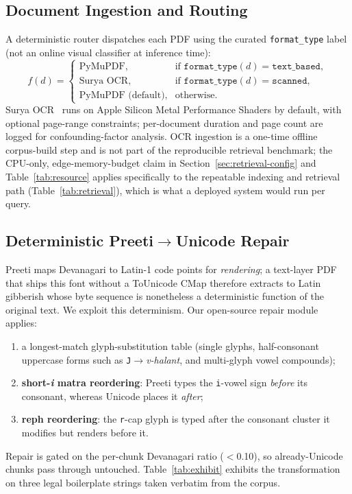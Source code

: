 \documentclass[journal]{IEEEtran}
\providecommand{\dev}[1]{\textit{#1}}
\begin{document}
\subsection{Document Ingestion and Routing}
A deterministic router dispatches each PDF using the curated \texttt{format\_type} label (not an online visual classifier at inference time):
\begin{equation}
f(d)=\begin{cases}
\text{PyMuPDF}, & \text{if }\texttt{format\_type}(d)=\texttt{text\_based},\\
\text{Surya OCR}, & \text{if }\texttt{format\_type}(d)=\texttt{scanned},\\
\text{PyMuPDF (default)}, & \text{otherwise}.
\end{cases}
\end{equation}
Surya OCR~\cite{surya2024} runs on Apple Silicon Metal Performance Shaders by default, with optional page-range constraints; per-document duration and page count are logged for confounding-factor analysis. OCR ingestion is a one-time offline corpus-build step and is not part of the reproducible retrieval benchmark; the CPU-only, edge-memory-budget claim in Section~\ref{sec:retrieval-config} and Table~\ref{tab:resource} applies specifically to the repeatable indexing and retrieval path (Table~\ref{tab:retrieval}), which is what a deployed system would run per query.

\subsection{Deterministic Preeti$\rightarrow$Unicode Repair}
\label{sec:repair}
Preeti maps Devanagari to Latin-1 code points for \emph{rendering}; a text-layer PDF that ships this font without a ToUnicode CMap therefore extracts to Latin gibberish whose byte sequence is nonetheless a deterministic function of the original text. We exploit this determinism. Our open-source repair module applies:
\begin{enumerate}
  \item a longest-match glyph-substitution table (single glyphs, half-consonant uppercase forms such as \texttt{J}$\rightarrow$\dev{v-halant}, and multi-glyph vowel compounds);
  \item \textbf{short-\emph{i} matra reordering}: Preeti types the \texttt{i}-vowel sign \emph{before} its consonant, whereas Unicode places it \emph{after};
  \item \textbf{reph reordering}: the \texttt{r}-cap glyph is typed after the consonant cluster it modifies but renders before it.
\end{enumerate}
Repair is gated on the per-chunk Devanagari ratio ($<$0.10), so already-Unicode chunks pass through untouched. Table~\ref{tab:exhibit} exhibits the transformation on three legal boilerplate strings taken verbatim from the corpus.
\end{document}

